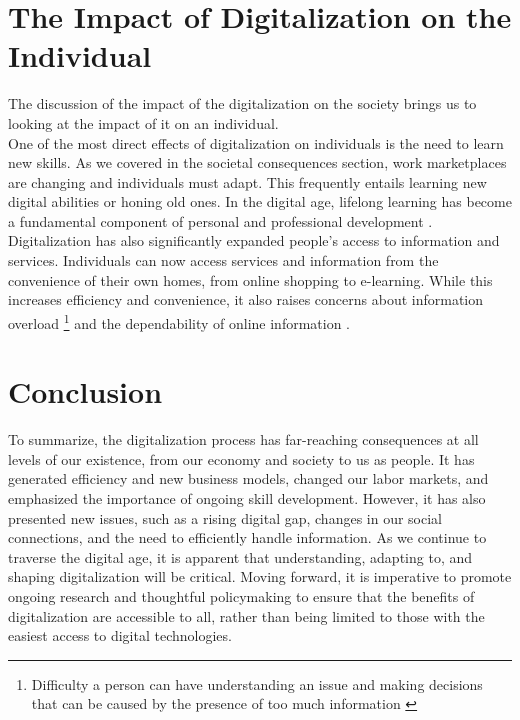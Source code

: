 \documentclass[12pt]{article}
\begin{document}
\section{The Impact of Digitalization on the Individual}
The discussion of the impact of the digitalization on the society brings us to looking at the impact of it on an individual. \\
One of the most direct effects of digitalization on individuals is the need to learn new skills. As we covered in the societal consequences section, work marketplaces are changing and individuals must adapt. This frequently entails learning new digital abilities or honing old ones. In the digital age, lifelong learning has become a fundamental component of personal and professional development \cite{Cendon.2018}. \\
Digitalization has also significantly expanded people's access to information and services. Individuals can now access services and information from the convenience of their own homes, from online shopping to e-learning. While this increases efficiency and convenience, it also raises concerns about information overload \footnote{Difficulty a person can have understanding an issue and making decisions that can be caused by the presence of too much information \cite{Aussu.}} and the dependability of online information \cite{Zheng.2023}.

\section{Conclusion}
To summarize, the digitalization process has far-reaching consequences at all levels of our existence, from our economy and society to us as people. It has generated efficiency and new business models, changed our labor markets, and emphasized the importance of ongoing skill development. However, it has also presented new issues, such as a rising digital gap, changes in our social connections, and the need to efficiently handle information. As we continue to traverse the digital age, it is apparent that understanding, adapting to, and shaping digitalization will be critical. Moving forward, it is imperative to promote ongoing research and thoughtful policymaking to ensure that the benefits of digitalization are accessible to all, rather than being limited to those with the easiest access to digital technologies.

\newpage

\end{document}
